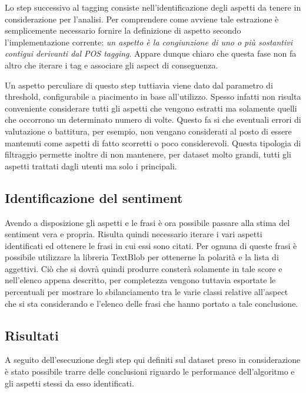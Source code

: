\documentclass[hidelinks, 12pt]{article}
\begin{document}
Lo step successivo al tagging consiste nell'identificazione degli aspetti da tenere in considerazione per l'analisi. Per comprendere come avviene tale estrazione è semplicemente necessario fornire la definizione di aspetto secondo l'implementazione corrente: {\it un aspetto è la congiunzione di uno o più sostantivi contigui derivanti dal POS tagging}. Appare dunque chiaro che questa fase non fa altro che iterare i tag e associare gli aspect di conseguenza.

Un aspetto perculiare di questo step tuttiavia viene dato dal parametro di threshold, configurabile a piacimento in base all'utilizzo. Spesso infatti non risulta conveniente considerare tutti gli aspetti che vengono estratti ma solamente quelli che occorrono un determinato numero di volte. Questo fa si che eventuali errori di valutazione o battitura, per esempio, non vengano considerati al posto di essere mantenuti come aspetti di fatto scorretti o poco considerevoli. Questa tipologia di filtraggio permette inoltre di non mantenere, per dataset molto grandi, tutti gli aspetti trattati dagli utenti ma solo i principali.

\subsection{Identificazione del sentiment}

Avendo a disposizione gli aspetti e le frasi è ora possibile passare alla stima del sentiment vera e propria. Risulta quindi necessario iterare i vari aspetti identificati ed ottenere le frasi in cui essi sono citati. Per ognuna di queste frasi è possibile utilizzare la libreria TextBlob \cite{site:textblob} per ottenerne la polarità e la lista di aggettivi. Ciò che si dovrà quindi produrre consterà solamente in tale score e nell'elenco appena descritto, per completezza vengono tuttavia esportate le percentuali per mostrare lo sbilanciamento tra le varie classi relative all'aspect che si sta considerando e l'elenco delle frasi che hanno portato a tale conclusione.

\subsection{Risultati}

A seguito dell'esecuzione degli step qui definiti sul dataset preso in considerazione è stato possibile trarre delle conclusioni riguardo le performance dell'algoritmo e gli aspetti stessi da esso identificati.
\end{document}
